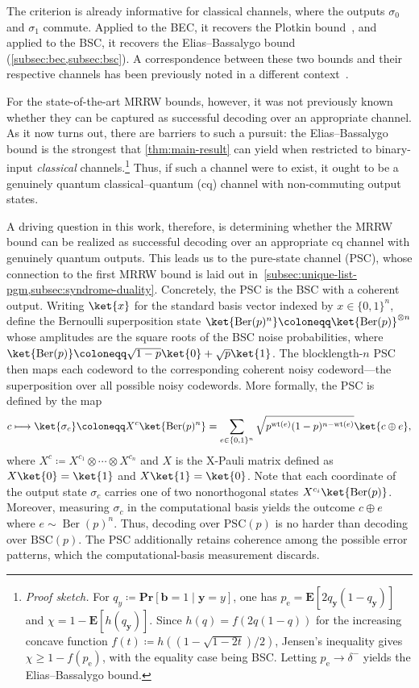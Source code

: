 \documentclass[11pt]{article}
\renewcommand{\geq}{\geqslant}
\theoremstyle{remark}
\newcommand{\Ber}{\operatorname{Ber}}
\newcommand{\wt}{\operatorname{wt}}
\newcommand{\Eb}{\mathbf{E}}
\newcommand{\Prb}{\mathbf{Pr}}
\newcommand{\bits}{\{0,1\}}
\newcommand{\bb}{\mathbf{b}}
\newcommand{\by}{\mathbf{y}}
\newcommand{\BSC}{\mathrm{BSC}}
\newcommand{\PSC}{\mathrm{PSC}}
\begin{document}
The criterion is already informative for classical channels, where the outputs $\sigma_0$ and $\sigma_1$ commute. Applied to the BEC, it recovers the Plotkin bound~\cite{Plo60}, and applied to the BSC, it recovers the Elias--Bassalygo bound~\cite{Eli55,Bas65} (\cref{subsec:bec,subsec:bsc}). A correspondence between these two bounds and their respective channels has been previously noted in a different context~\cite{Bla77,Dal15}.

For the state-of-the-art MRRW bounds, however, it was not previously known whether they can be captured as successful decoding over an appropriate channel. As it now turns out, there are barriers to such a pursuit: the Elias--Bassalygo bound is the strongest that \cref{thm:main-result} can yield when restricted to binary-input \emph{classical} channels.\footnote{\emph{Proof sketch.} For $q_y \coloneqq \Prb[\bb = 1 \mid \by = y]$, one has $p_{\mathrm{e}} = \Eb[2q_{\by}(1-q_{\by})]$ and $\chi = 1-\Eb[h(q_{\by})]$. Since $h(q) = f(2q(1-q))$ for the increasing concave function $f(t) \coloneqq h((1-\sqrt{1-2t})/2)$, Jensen's inequality gives $\chi \geq 1-f(p_{\mathrm{e}})$, with the equality case being BSC. Letting $p_{\mathrm{e}} \to \delta^-$ yields the Elias--Bassalygo bound.} Thus, if such a channel were to exist, it ought to be a genuinely quantum classical--quantum (cq) channel with non-commuting output states.

A driving question in this work, therefore, is determining whether the MRRW bound can be realized as successful decoding over an appropriate cq channel with genuinely quantum outputs. This leads us to the pure-state channel (PSC), whose connection to the first MRRW bound is laid out in~\cref{subsec:unique-list-pgm,subsec:syndrome-duality}. Concretely, the PSC is the BSC with a coherent output. Writing $\ket{x}$ for the standard basis vector indexed by $x \in \bits^n$, define the Bernoulli superposition state $\ket{\Ber(p)^n} \coloneqq \ket{\Ber(p)}^{\otimes n}$ whose amplitudes are the square roots of the BSC noise probabilities, where $\ket{\Ber(p)} \coloneqq \sqrt{1-p}\ket{0} + \sqrt{p}\ket{1}$. The blocklength-$n$ PSC then maps each codeword to the corresponding coherent noisy codeword---the superposition over all possible noisy codewords. More formally, the PSC is defined by the map
\begin{equation*}
c \longmapsto \ket{\sigma_c} \coloneqq X^c\ket{\Ber(p)^n}
= \sum_{e \in \bits^n}{\sqrt{p^{\wt(e)}(1-p)^{n-\wt(e)}}\ket{c \oplus e}},
\end{equation*}
where $X^c \coloneqq X^{c_1} \otimes \cdots \otimes X^{c_n}$ and $X$ is the X-Pauli matrix defined as $X\ket{0} = \ket{1}$ and $X\ket{1} = \ket{0}$. Note that each coordinate of the output state $\sigma_c$ carries one of two nonorthogonal states $X^{c_i}\ket{\Ber(p)}$. Moreover, measuring $\sigma_c$ in the computational basis yields the outcome $c \oplus e$ where $e \sim \Ber(p)^n$. Thus, decoding over $\PSC(p)$ is no harder than decoding over $\BSC(p)$. The PSC additionally retains coherence among the possible error patterns, which the computational-basis measurement discards.
\end{document}
